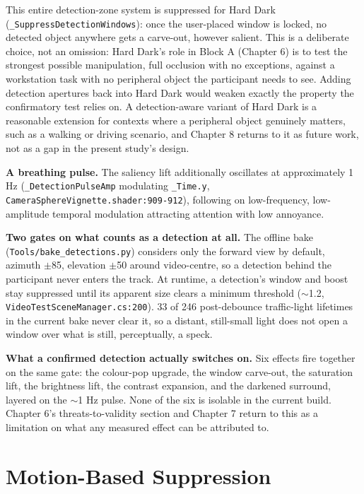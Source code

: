 This entire detection-zone system is suppressed for Hard Dark (\verb|_SuppressDetectionWindows|):
once the user-placed window is locked, no detected object anywhere gets a carve-out, however
salient. This is a deliberate choice, not an omission: Hard Dark's role in Block A (Chapter 6) is to
test the strongest possible manipulation, full occlusion with no exceptions, against a workstation
task with no peripheral object the participant needs to see. Adding detection apertures back into
Hard Dark would weaken exactly the property the confirmatory test relies on. A detection-aware
variant of Hard Dark is a reasonable extension for contexts where a peripheral object genuinely
matters, such as a walking or driving scenario, and Chapter 8 returns to it as future work, not as a
gap in the present study's design.

\textbf{A breathing pulse.} The saliency lift additionally oscillates at approximately 1 Hz
(\verb|_DetectionPulseAmp| modulating \verb|_Time.y|, \verb|CameraSphereVignette.shader:909-912|),
following \citet{waldner2014} on low-frequency, low-amplitude temporal modulation
attracting attention with low annoyance.

\textbf{Two gates on what counts as a detection at all.} The offline bake
(\verb|Tools/bake_detections.py|) considers only the forward view by default, azimuth $\pm$85\textdegree{},
elevation $\pm$50\textdegree{} around video-centre, so a detection behind the participant never enters the
track. At runtime, a detection's window and boost stay suppressed until its apparent size clears a
minimum threshold ($\sim$1.2\textdegree{}, \verb|VideoTestSceneManager.cs:200|). 33 of 246 post-debounce
traffic-light lifetimes in the current bake never clear it, so a distant, still-small light does not
open a window over what is still, perceptually, a speck.

\textbf{What a confirmed detection actually switches on.} Six effects fire together on the same
gate: the colour-pop upgrade, the window carve-out, the saturation lift, the brightness lift, the
contrast expansion, and the darkened surround, layered on the $\sim$1 Hz pulse. None of the six is
isolable in the current build. Chapter 6's threats-to-validity section and Chapter 7 return to this
as a limitation on what any measured effect can be attributed to.

\section{Motion-Based Suppression}

